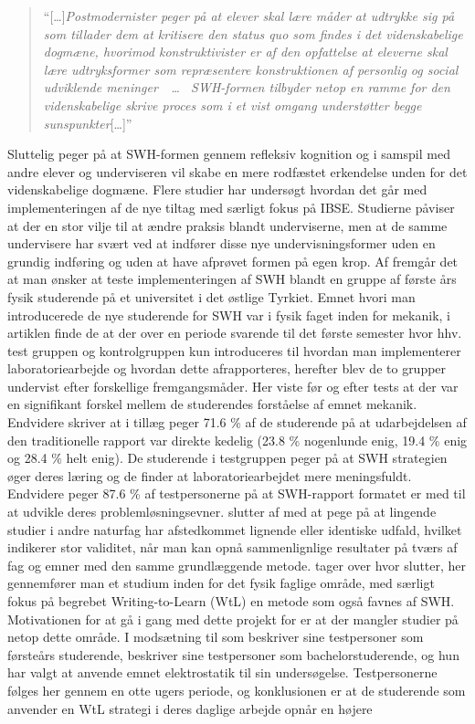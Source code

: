 \begin{quote}
``[\ldots]\emph{Postmodernister peger på at elever skal lære måder at udtrykke sig på som tillader dem at kritisere den status quo som findes i det videnskabelige dogmæne, hvorimod konstruktivister er af den opfattelse at eleverne skal lære udtryksformer som repræsentere konstruktionen af personlig og social udviklende meninger\, ~\ldots~ SWH-formen tilbyder netop en ramme for den videnskabelige skrive proces som i et vist omgang understøtter begge sunspunkter}[\ldots]''
\end{quote}
Sluttelig peger \citep{Keys1999} på at SWH-formen gennem refleksiv kognition og i samspil med andre elever og underviseren vil skabe en mere rodfæstet erkendelse unden for det videnskabelige dogmæne.  Flere studier \citep[m.fl.]{Akkus2007, Burke2005} har undersøgt hvordan det går med implementeringen af de nye tiltag med særligt fokus på IBSE. Studierne påviser at der en stor vilje til at ændre praksis blandt underviserne, men at de samme undervisere har svært ved at indfører disse nye undervisningsformer uden en grundig indføring og uden at have afprøvet formen på egen krop. Af \citep{Erkol2010} fremgår det at man ønsker at teste implementeringen af SWH blandt en gruppe af første års fysik studerende på et universitet i det østlige Tyrkiet.  Emnet hvori man introducerede de nye studerende for SWH var i fysik faget inden for mekanik, i artiklen finde de at der over en periode svarende til det første semester hvor hhv. test gruppen og kontrolgruppen kun introduceres til hvordan man implementerer laboratoriearbejde og hvordan dette afrapporteres, herefter blev de to grupper undervist efter forskellige fremgangsmåder. Her viste før og efter tests at der var en signifikant forskel mellem de studerendes forståelse af emnet mekanik. Endvidere skriver \citet{Erkol2010} at i tillæg peger 71.6 \% af de studerende på at udarbejdelsen af den traditionelle rapport var direkte kedelig (23.8 \% nogenlunde enig, 19.4 \% enig og 28.4 \% helt enig). De studerende i testgruppen peger på at SWH strategien øger deres læring og de finder at laboratoriearbejdet mere meningsfuldt. Endvidere peger 87.6 \% af testpersonerne på at SWH-rapport formatet er med til at udvikle deres problemløsningsevner. \citep{Erkol2010} slutter af med at pege på at lingende studier i andre naturfag har afstedkommet lignende eller identiske udfald, hvilket indikerer stor validitet, når man kan opnå sammenlignlige resultater på tværs af fag og emner med den samme grundlæggende metode. \citep{Atasoy2013} tager over hvor \citep{Erkol2010} slutter, her gennemfører man et studium inden for det fysik faglige område, med særligt fokus på begrebet Writing-to-Learn (WtL) en metode som også favnes af SWH. Motivationen for at gå i gang med dette projekt for \citep{Atasoy2013} er at der mangler studier på netop dette område. I modsætning til \citet{Erkol2010} som beskriver sine testpersoner som førsteårs studerende, beskriver \citet{Atasoy2013} sine testpersoner som bachelorstuderende, og hun har valgt at anvende emnet elektrostatik til sin undersøgelse. Testpersonerne følges her gennem en otte ugers periode, og konklusionen er at de studerende som anvender en WtL strategi i deres daglige arbejde opnår en højere 